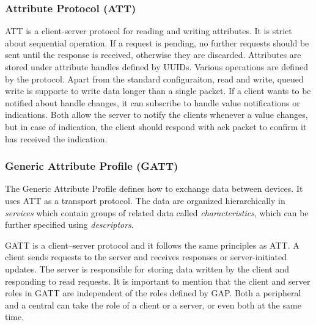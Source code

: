 \subsubsection{Attribute Protocol (ATT)}
ATT is a client-server protocol for reading and writing attributes. It is strict about sequential operation. If a request is pending, no further requests should be sent until the response is received, otherwise they are discarded. Attributes are stored under attribute handles defined by UUIDs. Various operations are defined by the protocol. Apart from the standard configuraiton, read and write, queued write is supporte to write data longer than a single packet. If a client wants to be notified about handle changes, it can subscribe to handle value notifications or indications. Both allow the server to notify the clients whenever a value changes, but in case of indication, the client should respond with ack packet to confirm it has received the indication.

\subsubsection{Generic Attribute Profile (GATT)}

The Generic Attribute Profile defines how to exchange data between devices. It uses ATT as a transport protocol. The data are organized hierarchically in \textit{services} which contain groups of related data called \textit{characteristics}, which can be further specified using \textit{descriptors}.

GATT is a client–server protocol and it follows the same principles as ATT. A client sends requests to the server and receives responses or server-initiated updates. The server is responsible for storing data written by the client and responding to read requests. It is important to mention that the client and server roles in GATT are independent of the roles defined by GAP. Both a peripheral and a central can take the role of a client or a server, or even both at the same time.

\fi



